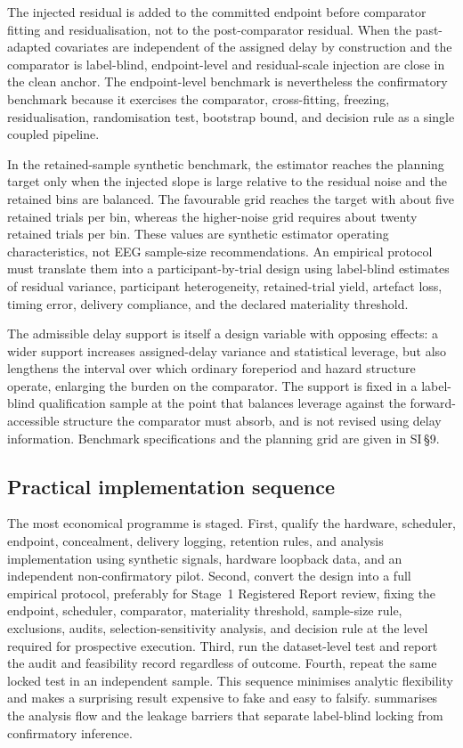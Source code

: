 \documentclass[11pt,a4paper]{article}
\theoremstyle{definition}
\begin{document}
The injected residual is added to the committed endpoint before comparator fitting
and residualisation, not to the post-comparator residual. When the past-adapted
covariates are independent of the assigned delay by construction and the comparator
is label-blind, endpoint-level and residual-scale injection are close in the clean
anchor. The endpoint-level benchmark is nevertheless the confirmatory benchmark
because it exercises the comparator, cross-fitting, freezing, residualisation,
randomisation test, bootstrap bound, and decision rule as a single coupled
pipeline.

In the retained-sample synthetic benchmark, the estimator reaches the planning
target only when the injected slope is large relative to the residual noise and
the retained bins are balanced. The favourable grid reaches the target with
about five retained trials per bin, whereas the higher-noise grid requires about
twenty retained trials per bin. These values are synthetic estimator operating
characteristics, not EEG sample-size recommendations. An empirical protocol must
translate them into a participant-by-trial design using label-blind estimates of
residual variance, participant heterogeneity, retained-trial yield, artefact
loss, timing error, delivery compliance, and the declared materiality threshold.

The admissible delay support is itself a design variable with opposing effects:
a wider support increases assigned-delay variance and statistical leverage, but
also lengthens the interval over which ordinary foreperiod and hazard structure
operate, enlarging the burden on the comparator. The support is fixed in a
label-blind qualification sample at the point that balances leverage against the
forward-accessible structure the comparator must absorb, and is not revised
using delay information. Benchmark specifications and the planning grid are
given in SI\,\S9.

\subsection{Practical implementation sequence}
\label{sec:implementation}

The most economical programme is staged. First, qualify the hardware, scheduler,
endpoint, concealment, delivery logging, retention rules, and analysis
implementation using synthetic signals, hardware loopback data, and an
independent non-confirmatory pilot. Second, convert the design into a
full empirical protocol, preferably for
Stage~1 Registered Report review, fixing the endpoint, scheduler, comparator,
materiality threshold, sample-size rule, exclusions, audits,
selection-sensitivity analysis, and decision rule at the level required for
prospective execution. Third, run the dataset-level
test and report the audit and feasibility record regardless of outcome. Fourth,
repeat the same locked test in an independent sample. This sequence minimises
analytic flexibility and makes a surprising result expensive to fake and easy to
falsify.  summarises the analysis flow and the leakage
barriers that separate label-blind locking from confirmatory inference.
\end{document}
